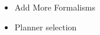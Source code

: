 \documentclass[pdftex,12pt,a4paper]{report}
\begin{document}
\begin{itemize}
\item Add More Formalisms
\item Planner selection
\end{itemize}
%
%
%
%
%
%
%
%
%
\end{document}
